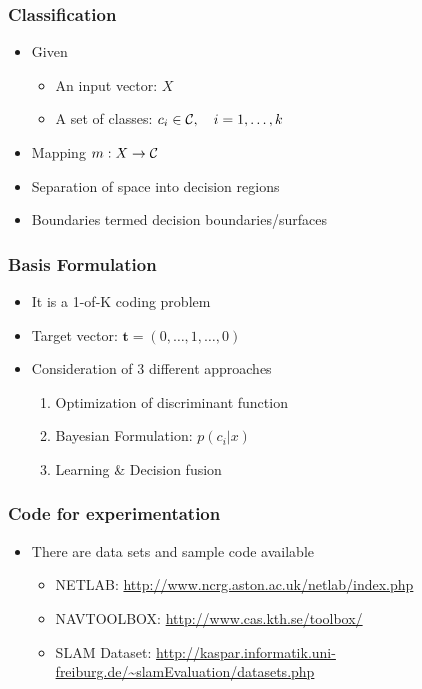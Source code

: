 \documentclass[10pt]{beamer}
\begin{document}
\begin{frame}
  \frametitle{Classification}
  \begin{itemize}
  \item Given 
    \begin{itemize}
    \item An input vector: $X$
    \item A set of classes: $c_i \in {\cal C}, \quad i=1, \ldots, k$
    \end{itemize}
  \item Mapping $m: X \rightarrow {\cal C}$
  \item Separation of space into decision regions
  \item Boundaries termed decision boundaries/surfaces
  \end{itemize}
\end{frame}

\begin{frame}
  \frametitle{Basis Formulation}
  \begin{itemize}
  \item It is a 1-of-K coding problem
  \item Target vector: ${\mathbf t} =\left( 0, \ldots, 1, \ldots, 0
    \right)$
  \item Consideration of 3 different approaches
    \begin{enumerate}
    \item Optimization of discriminant function
    \item Bayesian Formulation: $p(c_i | x)$
    \item Learning \& Decision fusion
    \end{enumerate}
  \end{itemize}
\end{frame}

\begin{frame}
  \frametitle{Code for experimentation}
  \begin{itemize}
  \item There are data sets and sample code available
    \begin{itemize}
    \item NETLAB: \url{http://www.ncrg.aston.ac.uk/netlab/index.php}
    \item NAVTOOLBOX: \url{http://www.cas.kth.se/toolbox/}
    \item SLAM Dataset: \url{http://kaspar.informatik.uni-freiburg.de/~slamEvaluation/datasets.php}
    \end{itemize}
  \end{itemize}
\end{frame}
\end{document}
